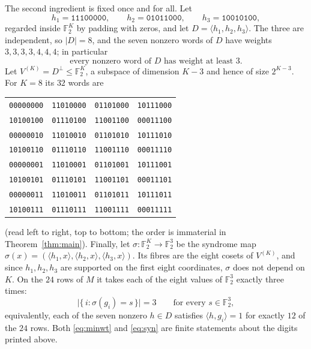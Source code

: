\documentclass[11pt]{amsart}
\newcommand{\FF}{\mathbb{F}_2}
\begin{document}
The second ingredient is fixed once and for all. Let
\[
 h_1=\texttt{11100000},\qquad
 h_2=\texttt{01011000},\qquad
 h_3=\texttt{10010100},
\]
regarded inside $\FF^K$ by padding with zeros, and let $D=\langle h_1,h_2,h_3\rangle$. The three are
independent, so $\lvert D\rvert=8$, and the seven nonzero words of $D$ have weights
$3,3,3,3,4,4,4$; in particular
\begin{equation}\label{eq:minwt}
 \text{every nonzero word of } D \text{ has weight at least } 3 .
\end{equation}
Let $V^{(K)}=D^{\perp}\le\FF^K$, a subspace of dimension $K-3$ and hence of size $2^{K-3}$. For
$K=8$ its $32$ words are
\begin{center}
\small
\begin{tabular}{l@{\quad}l@{\quad}l@{\quad}l}
\texttt{00000000}&\texttt{11010000}&\texttt{01101000}&\texttt{10111000}\\
\texttt{10100100}&\texttt{01110100}&\texttt{11001100}&\texttt{00011100}\\
\texttt{00000010}&\texttt{11010010}&\texttt{01101010}&\texttt{10111010}\\
\texttt{10100110}&\texttt{01110110}&\texttt{11001110}&\texttt{00011110}\\
\texttt{00000001}&\texttt{11010001}&\texttt{01101001}&\texttt{10111001}\\
\texttt{10100101}&\texttt{01110101}&\texttt{11001101}&\texttt{00011101}\\
\texttt{00000011}&\texttt{11010011}&\texttt{01101011}&\texttt{10111011}\\
\texttt{10100111}&\texttt{01110111}&\texttt{11001111}&\texttt{00011111}\\
\end{tabular}
\end{center}
(read left to right, top to bottom; the order is immaterial in
Theorem~\ref{thm:main}).
Finally, let $\sigma\colon\FF^K\to\FF^3$ be the syndrome map
$\sigma(x)=(\langle h_1,x\rangle,\langle h_2,x\rangle,\langle h_3,x\rangle)$. Its fibres are the
eight cosets of $V^{(K)}$, and since $h_1,h_2,h_3$ are supported on the first eight coordinates,
$\sigma$ does not depend on $K$. On the $24$ rows of $M$ it takes each of the eight values of
$\FF^3$ exactly three times:
\begin{equation}\label{eq:syn}
 \bigl\lvert\{\,i : \sigma(g_i)=s\,\}\bigr\rvert=3\qquad\text{for every }s\in\FF^3 ,
\end{equation}
equivalently, each of the seven nonzero $h\in D$ satisfies $\langle h,g_i\rangle=1$ for exactly
$12$ of the $24$ rows. Both \eqref{eq:minwt} and \eqref{eq:syn} are finite statements about the
digits printed above.
\end{document}
